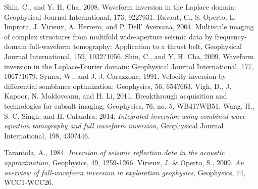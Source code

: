 \documentclass[mreferee]{gji}
\begin{document}
\begin{thebibliography}{}
 Shin, C., and Y. H. Cha, 2008. Waveform inversion in the Laplace domain: Geophysical Journal International, 173, 922?931. 
 Ravaut, C., S. Operto, L. Improta, J. Virieux, A. Herrero, and P. Dell' Aversana, 2004. Multiscale imaging of complex structures from multifold wide-aperture seismic data by frequency-domain full-waveform tomography: Application to a thrust belt, Geophysical Journal International, 159, 1032?1056.
 Shin, C., and Y. H. Cha, 2009. Waveform inversion in the Laplace-Fourier domain: Geophysical Journal International, 177, 1067?1079.
 Symes, W., and J. J. Carazzone, 1991. Velocity inversion by differential semblance optimization: Geophysics, 56, 654?663.
 Vigh, D., J. Kapoor, N. Moldoveanu, and H. Li, 2011. Breakthrough acquisition and technologies for subsalt imaging, Geophysics, 76, no. 5, WB41?WB51.
 Wang, H., S. C. Singh, and H. Calandra, 2014. \textit{Integrated inversion using combined wave-equation tomography and full waveform inversion}, Geophysical Journal International, 198, 430?446.


  

   Tarantola, A., 1984. \textit{Inversion of seismic reflection data in the acoustic approximation}, Geophysics, 49, 1259-1266.
    Virieux, J. \& Operto, S., 2009. \textit{An overview of full-waveform inversion in exploration geophysics}, Geophysics, 74, WCC1-WCC26.

\end{thebibliography}
\end{document}

